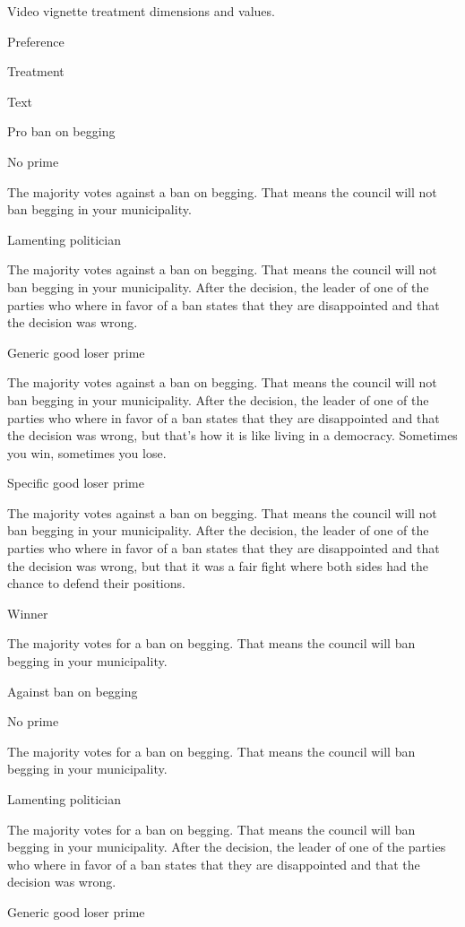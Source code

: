 \documentclass[
]{book}
\begin{document}
Video vignette treatment dimensions and values.

Preference

Treatment

Text

Pro ban on begging

No prime

The majority votes against a ban on begging. That means the council will
not ban begging in your municipality.

Lamenting politician

The majority votes against a ban on begging. That means the council will
not ban begging in your municipality. After the decision, the leader of
one of the parties who where in favor of a ban states that they are
disappointed and that the decision was wrong.

Generic good loser prime

The majority votes against a ban on begging. That means the council will
not ban begging in your municipality. After the decision, the leader of
one of the parties who where in favor of a ban states that they are
disappointed and that the decision was wrong, but that's how it is like
living in a democracy. Sometimes you win, sometimes you lose.

Specific good loser prime

The majority votes against a ban on begging. That means the council will
not ban begging in your municipality. After the decision, the leader of
one of the parties who where in favor of a ban states that they are
disappointed and that the decision was wrong, but that it was a fair
fight where both sides had the chance to defend their positions.

Winner

The majority votes for a ban on begging. That means the council will ban
begging in your municipality.

Against ban on begging

No prime

The majority votes for a ban on begging. That means the council will ban
begging in your municipality.

Lamenting politician

The majority votes for a ban on begging. That means the council will ban
begging in your municipality. After the decision, the leader of one of
the parties who where in favor of a ban states that they are
disappointed and that the decision was wrong.

Generic good loser prime
\end{document}
